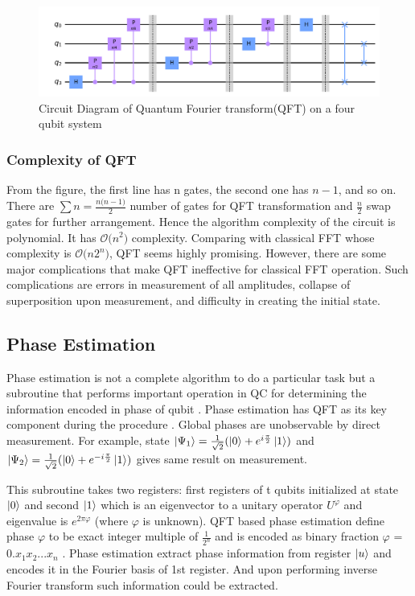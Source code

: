 \begin{figure}[H]
    \centering
    \includegraphics[width = \linewidth]{figures/QFT_for_4q.png}
  \caption{Circuit Diagram of Quantum Fourier transform(\acrshort{QFT}) on a four qubit system}
  \label{fig: QFT circuit diagram}
\end{figure}

\subsubsection{Complexity of QFT}
From the figure, the first line has n gates, the second one has $n-1$, and so on. There are $\sum n = \frac{n\bigr(n-1\bigl)}{2}$ number of gates for QFT transformation and $\frac{n}{2}$ swap gates for further arrangement. Hence the algorithm complexity of the circuit is polynomial. It has $\mathcal{O}\bigr(n^2\bigl)$ complexity.
Comparing with classical \acrshort{FFT} whose complexity is $\mathcal{O}\bigr(n 2^n\bigl)$, QFT seems highly promising. However, there are some major complications that make QFT ineffective for classical \acrshort{FFT} operation. Such complications are errors in measurement of all amplitudes, collapse of superposition upon measurement, and difficulty in creating the initial state.

\subsection{Phase Estimation}
Phase estimation is not a complete algorithm to do a particular task but a subroutine that performs important operation in \acrshort{QC} for determining the information encoded in phase of qubit \cite{johnston2019}. Phase estimation has QFT as its key component during the procedure \cite{Nielsen2002}. Global phases are unobservable by direct measurement. For example, state $\ket{\Psi_1} = \frac{1}{\sqrt{2}}(\ket{0} + e^{i \frac{\pi}{2}} \ket{1})$ and $\ket{\Psi_2} = \frac{1}{\sqrt{2}}(\ket{0} + e^{-i \frac{\pi}{2}} \ket{1})$ gives same result on measurement.

This subroutine takes two registers: first registers of t qubits initialized at state $\ket{0}$ and second $\ket{1}$ which is an eigenvector to a unitary operator $U^\varphi$ and eigenvalue is $e^{2\pi\varphi}$ (where $\varphi$ is unknown). QFT based phase estimation define phase $\varphi$ to be exact integer multiple of $\frac{1}{2^n}$ and is encoded as binary fraction $\varphi$ = $0.x_1 x_2 . . . x_n$ \cite{Nielsen2002}. Phase estimation extract phase information from register $\ket{u}$ and encodes it in the Fourier basis of 1st register. And upon performing inverse Fourier transform such information could be extracted.

